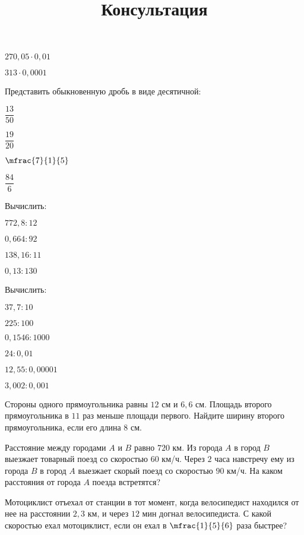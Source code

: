 \begin{listofex}
\begin{enumcols}[itemcolumns=4]
		\item \( 270,05\cdot0,01 \)
		\item \( 313\cdot0,0001 \)
	\end{enumcols}
	\item Представить обыкновенную дробь в виде десятичной:
	\begin{enumcols}[itemcolumns=4]
		\item \( \dfrac{13}{50} \)
		\item \( \dfrac{19}{20} \)
		\item \( \mfrac{7}{1}{5} \)
		\item \( \dfrac{84}{6} \)
	\end{enumcols}
	\item Вычислить:
	\begin{enumcols}[itemcolumns=3]
		\item \( 772,8:12 \)
		\item \( 0,664:92\)
		\item \( 138,16:11 \)
		\item \( 0,13:130 \)
	\end{enumcols}
	\item Вычислить:
	\begin{enumcols}[itemcolumns=3]
		\item \( 37,7:10 \)
		\item \( 225:100 \)
		\item \( 0,1546:1000 \)
		\item \( 24:0,01 \)
		\item \( 12,55:0,00001 \)
		\item \( 3,002:0,001 \)
	\end{enumcols}
\end{listofex}
\newpage
\title{Консультация}
\begin{listofex}
	\item Стороны одного прямоугольника равны \( 12 \) см и \( 6,6 \) см. Площадь второго
	прямоугольника в \( 11 \) раз меньше площади первого. Найдите ширину второго прямоугольника,
	если его длина \( 8 \) см.
	\item Расстояние между городами \( A \) и \( B \) равно \( 720 \) км. Из города \( A \) в город \( B \) выезжает товарный поезд со скоростью \( 60 \) км/ч. Через \( 2 \) часа навстречу ему из города \( B \) в город \( A \) выезжает скорый поезд со скоростью \( 90 \) км/ч. На каком расстояния от города \( A \) поезда встретятся?
	\item Мотоциклист отъехал от станции в тот момент, когда велосипедист находился от нее на
	расстоянии \( 2,3 \) км, и через \( 12 \) мин догнал велосипедиста. С какой скоростью ехал мотоциклист, если он ехал в \( \mfrac{1}{5}{6} \) раза быстрее?
\end{listofex}